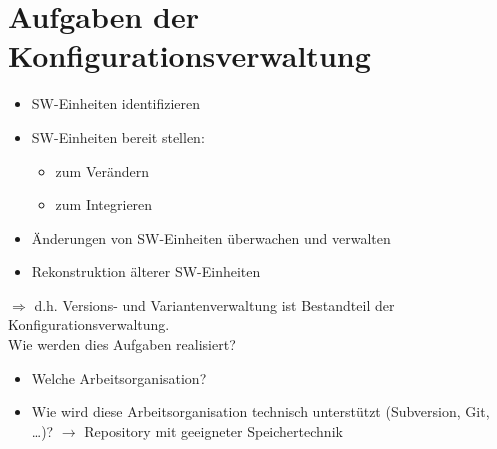 \section{Aufgaben der Konfigurationsverwaltung}
\begin{itemize}
\item SW-Einheiten identifizieren
\item SW-Einheiten bereit stellen:
\begin{itemize}
\item zum Verändern
\item zum Integrieren
\end{itemize}
\item Änderungen von SW-Einheiten überwachen und verwalten
\item Rekonstruktion älterer SW-Einheiten
\end{itemize}
$\Rightarrow$ d.h. Versions- und Variantenverwaltung ist Bestandteil der Konfigurationsverwaltung.\\
Wie werden dies Aufgaben realisiert?
\begin{itemize}
\item Welche Arbeitsorganisation?
\item Wie wird diese Arbeitsorganisation technisch unterstützt (Subversion, Git, …)? $\to$ Repository mit geeigneter Speichertechnik
\end{itemize}

